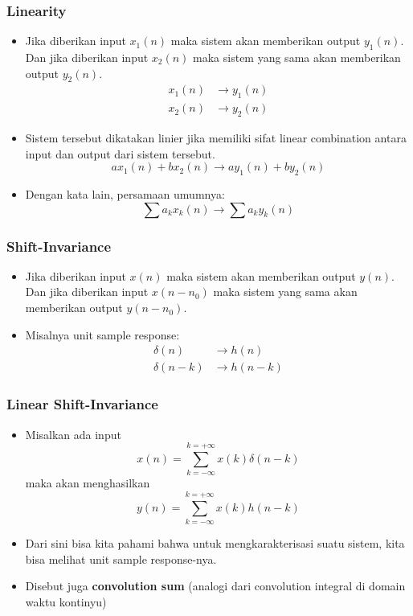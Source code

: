 \documentclass[pdflatex,compress]{beamer}
\begin{document}
\begin{frame}
	\frametitle{Linearity}
	\begin{itemize}
		\item Jika diberikan input $ x_1(n) $ maka sistem akan memberikan output $ y_1(n) $. Dan jika diberikan input $ x_2(n) $ maka sistem yang sama akan memberikan output $ y_2(n) $.
		\begin{align*}
			x_1(n) &\rightarrow y_1(n) \\
			x_2(n) &\rightarrow y_2(n)
		\end{align*}
		\item Sistem tersebut dikatakan linier jika memiliki sifat linear combination antara input dan output dari sistem tersebut.
		\[ ax_1(n) + bx_2(n) \rightarrow ay_1(n) + by_2(n)\]
		\item Dengan kata lain, persamaan umumnya:
		\[ \sum a_k x_k(n) \rightarrow \sum a_k y_k(n) \]
	\end{itemize}
\end{frame}

\begin{frame}
	\frametitle{Shift-Invariance}
	\begin{itemize}
		\item Jika diberikan input $ x(n) $ maka sistem akan memberikan output $ y(n) $. Dan jika diberikan input $ x(n-n_0) $ maka sistem yang sama akan memberikan output $ y(n-n_0) $.
		\item Misalnya unit sample response:
		\begin{align*}
			\delta(n) &\rightarrow h(n) \\
			\delta(n-k) &\rightarrow h(n-k)
		\end{align*}
	\end{itemize}
\end{frame}

\begin{frame}
	\frametitle{Linear Shift-Invariance}
	\begin{itemize}
		\item Misalkan ada input \[ x(n) = \sum_{k = -\infty}^{k = +\infty} x(k)\delta(n-k) \]
		maka akan menghasilkan \[ y(n) = \sum_{k = -\infty}^{k = +\infty} x(k)h(n-k) \]
		\item Dari sini bisa kita pahami bahwa untuk mengkarakterisasi suatu sistem, kita bisa melihat unit sample response-nya.
		\item Disebut juga \textbf{convolution sum} (analogi dari convolution  integral di domain waktu kontinyu)
	\end{itemize}
\end{frame}
\end{document}
